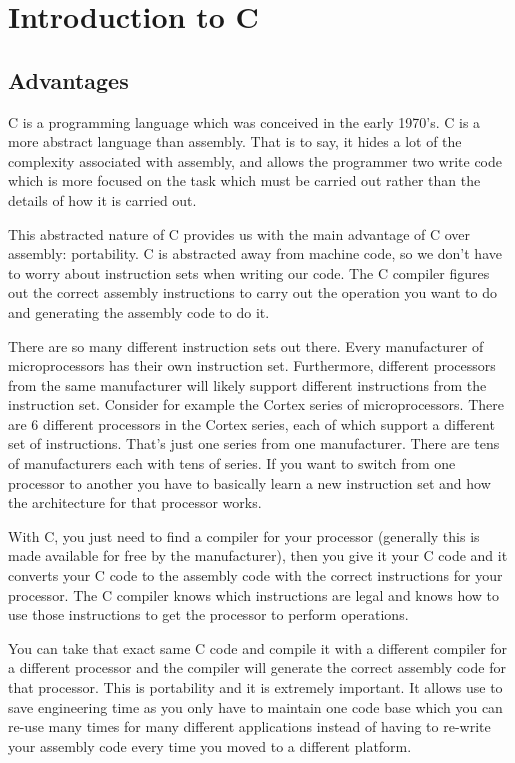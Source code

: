 \chapter{Introduction to C}
\section{Advantages}
C is a programming language which was conceived in the early 1970's. 
C is a more abstract language than assembly.
That is to say, it hides a lot of the complexity associated with assembly, and allows the programmer two write code which is more focused on the task which must be carried out rather than the details of how it is carried out.

This abstracted nature of C provides us with the main advantage of C over assembly: portability. 
C is abstracted away from machine code, so we don't have to worry about instruction sets when writing our code. 
The C compiler figures out the correct assembly instructions to carry out the operation you want to do and generating the assembly code to do it.

There are so many different instruction sets out there. 
Every manufacturer of microprocessors has their own instruction set. 
Furthermore, different processors from the same manufacturer will likely support different instructions from the instruction set.
Consider for example the Cortex series of microprocessors. 
There are 6 different processors in the Cortex series, each of which support a different set of instructions. 
That's just one series from one manufacturer. There are tens of manufacturers each with tens of series. 
If you want to switch from one processor to another you have to basically learn a new instruction set and how the architecture for that processor works. 

With C, you just need to find a compiler for your processor (generally this is made available for free by the manufacturer), then you give it your C code and it converts your C code to the assembly code with the correct instructions for your processor. The C compiler knows which instructions are legal and knows how to use those instructions to get the processor to perform operations.

You can take that exact same C code and compile it with a different compiler for a different processor and the compiler will generate the correct assembly code for that processor. 
This is portability and it is extremely important. 
It allows use to save engineering time as you only have to maintain one code base which you can re-use many times for many different applications instead of having to re-write your assembly code every time you moved to a different platform.\\

